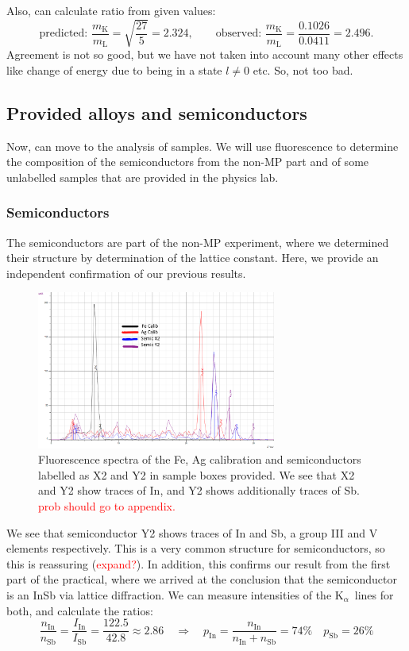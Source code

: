 \documentclass[11pt,a4paper,twoside,onecolumn]{article}
\newcommand{\reminder}[1]{\textcolor{red}{#1}}
\newcommand{\Kalpha}{$\mathrm{K}_\alpha$~}
\begin{document}
Also, can calculate ratio from given values:
\begin{equation}
    \text{predicted: }\frac{m_\mathrm{K}}{m_\mathrm{L}} = \sqrt{\frac{27}{5}} = 2.324,\qquad \text{observed: } \frac{m_\mathrm{K}}{m_\mathrm{L}} = \frac{0.1026}{0.0411} = 2.496.
\end{equation}
Agreement is not so good, but we have not taken into account many other effects like change of energy due to being in a state $l \neq 0$ etc. So, not too bad. %

\subsection{Provided alloys and semiconductors}
Now, can move to the analysis of samples. We will use fluorescence to determine the composition of the semiconductors from the non-MP part and of some unlabelled samples that are provided in the physics lab.

\subsubsection{Semiconductors}
The semiconductors are part of the non-MP experiment, where we determined their structure by determination of the lattice constant. Here, we provide an independent confirmation of our previous results. 
\begin{figure}[!htbp]
    \centering
    \includegraphics[width=0.7\textwidth]{img/spect-semiconductors.png}
    \caption{Fluorescence spectra of the Fe, Ag calibration and semiconductors labelled as X2 and Y2 in sample boxes provided. We see that X2 and Y2 show traces of In, and Y2 shows additionally traces of Sb. \reminder{prob should go to appendix.}}
    \label{fig:spect-semiconductors}
\end{figure}

We see that semiconductor Y2 shows traces of In and Sb, a group III and V elements respectively. This is a very common structure for semiconductors, so this is reassuring (\reminder{expand?}). In addition, this confirms our result from the first part of the practical, where we arrived at the conclusion that the semiconductor is an InSb via lattice diffraction. We can measure intensities of the \Kalpha lines for both, and calculate the ratios:
\begin{equation}
    \frac{n_\mathrm{In}}{n_\mathrm{Sb}} = \frac{I_\mathrm{In}}{I_\mathrm{Sb}} = \frac{122.5}{42.8} \approx 2.86 \quad \Rightarrow \quad p_\mathrm{In} = \frac{n_\mathrm{In}}{n_\mathrm{In}+n_\mathrm{Sb}} = 74 \% \quad p_\mathrm{Sb} = 26 \%
\end{equation}
\end{document}
